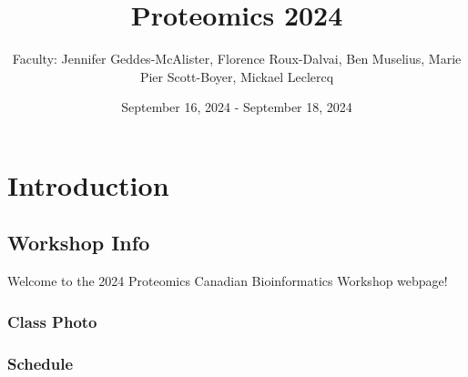 \documentclass[
]{book}
\title{Proteomics 2024}
\author{Faculty: Jennifer Geddes-McAlister, Florence Roux-Dalvai, Ben Muselius, Marie Pier Scott-Boyer, Mickael Leclercq}
\date{September 16, 2024 - September 18, 2024}
\begin{document}
\maketitle

{
\setcounter{tocdepth}{1}
\tableofcontents
}
\part{Introduction}\label{part-introduction}

\chapter{Workshop Info}\label{workshop-info}

Welcome to the 2024 Proteomics Canadian Bioinformatics Workshop webpage!

\section{Class Photo}\label{class-photo}

\section{Schedule}\label{schedule}
\end{document}
